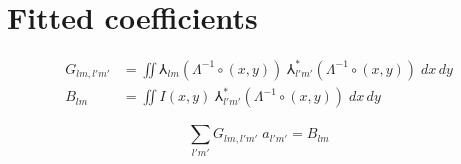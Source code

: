 \section{Fitted coefficients}

\begin{equation}
\begin{aligned}
  G_{lm,l'm'} &= \iint \Yup_{lm}(\Lambda^{-1}\circ(x,y)) \;
                 \Yup_{l'm'}^*(\Lambda^{-1}\circ(x,y)) \; dx\,dy  \\
  B_{lm}      &= \iint I(x,y) \;
                 \Yup_{l'm'}^*(\Lambda^{-1}\circ(x,y)) \; dx\,dy
\end{aligned}
\end{equation}

\begin{equation}
  \sum_{l'm'} G_{lm,l'm'} \; a_{l'm'} = B_{lm}
\end{equation}

